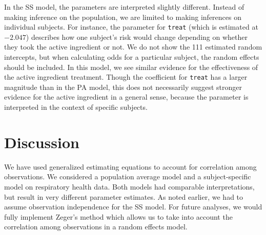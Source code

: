 \documentclass[12pt]{article}
\begin{document}
\noindent In the SS model, the parameters are interpreted slightly different. Instead of making inference on the population, we are limited to making inferences on individual subjects. For instance, the parameter for \texttt{treat} (which is estimated at $-2.047$) describes how one subject's risk would change depending on whether they took the active ingredient or not. We do not show the 111 estimated random intercepts, but when calculating odds for a particular subject, the random effects should be included. In this model, we see similar evidence for the effectiveness of the active ingredient treatment. Though the coefficient for \texttt{treat} has a larger magnitude than in the PA model, this does not necessarily suggest stronger evidence for the active ingredient in a general sense, because the parameter is interpreted in the context of specific subjects.

\section*{Discussion}

\noindent We have used generalized estimating equations to account for correlation among observations. We considered a population average model and a subject-specific model on respiratory health data. Both models had comparable interpretations, but result in very different parameter estimates. As noted earlier, we had to assume observation independence for the SS model. For future analyses, we would fully implement Zeger's method which allows us to take into account the correlation among observations in a random effects model.

\begin{footnotesize}

\end{footnotesize}
\end{document}

